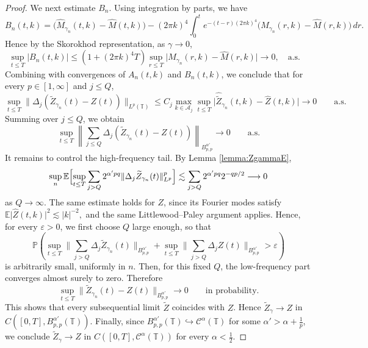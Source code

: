 \documentclass[10pt,a4paper]{amsart}
\begin{document}
\begin{proof}
We next estimate \(B_n\). Using integration by parts, we have
\[
B_n(t,k)
=
\bigl(\widehat M_{\gamma_n}(t,k)-\widehat M(t,k)\bigr)
-
(2\pi k)^4
\int_0^t
e^{-(t-r)(2\pi k)^4}
\bigl(\widehat M_{\gamma_n}(r,k)-\widehat M(r,k)\bigr)\,dr.
\]
Hence by the Skorokhod representation, as $\gamma \to 0$,
\[
\sup_{t\le T}|B_n(t,k)|
\le
\left(1+(2\pi k)^4T\right)
\sup_{r\le T}
\bigl|
\widehat M_{\gamma_n}(r,k)-\widehat M(r,k)
\bigr| \to 0, \quad \text{a.s.} \quad 
\]
Combining with convergences of $A_n(t,k)$ and $B_n(t,k)$, we conclude that for every \(p\in[1,\infty]\) and \(j \le Q\),
\[
\sup_{t\le T}
\|\Delta_j(\widetilde Z_{\gamma_n}(t)-Z(t))\|_{L^p(\mathbb T)}
\le
C_j
\max_{k\in\mathcal A_j}
\sup_{t\le T}
\bigl|
\widehat{\widetilde Z}_{\gamma_n}(t,k)-\widehat Z(t,k)
\bigr|
\longrightarrow0
\qquad\text{a.s.}
\]
Summing over \(j \le Q\), we obtain
\[
\sup_{t\le T}
\left\|
\sum_{j \le Q}\Delta_j(\widetilde Z_{\gamma_n}(t)-Z(t))
\right\|_{B^{\alpha'}_{p,p}}
\rightarrow0
\qquad\text{a.s.}
\]
It remains to control the high-frequency tail.
By Lemma \ref{lemma:ZgammaE},
\[
\sup_n
\mathbb E
\Bigl[
\sup_{t\le T}
\sum_{j>Q}2^{\alpha' pq}\|\Delta_j\widetilde Z_{\gamma_n}(t)\|_{L^p}^p
\Bigr]
\lesssim
\sum_{j>Q}2^{\alpha' pq}2^{-qp/2}\longrightarrow0
\]
as \(Q\to\infty\).
The same estimate holds for \(Z\), since its Fourier modes satisfy
\(
\mathbb E\bigl|\widehat Z(t,k)\bigr|^2
\lesssim |k|^{-2},
\)
and the same Littlewood--Paley argument applies.
Hence, for every \(\varepsilon>0\), we first choose \(Q\) large enough, so that
\[
\mathbb P\!\left(
\sup_{t\le T} \big\|\sum_{j>Q}\Delta_j\widetilde Z_{\gamma_n}(t)
\big\|_{B^{\alpha'}_{p,p}} + \sup_{t\le T}
\big\|\sum_{j>Q}\Delta_j Z(t) \big\|_{B^{\alpha'}_{p,p}} > \varepsilon
\right)
\]
is arbitrarily small, uniformly in \(n\). Then, for this fixed \(Q\), the low-frequency part converges almost surely to zero.
Therefore
\[
\sup_{t\le T}\|\widetilde Z_{\gamma_n}(t)-Z(t)\|_{B^{ \alpha'}_{p,p}}
\rightarrow0
\qquad\text{in probability.}
\]
This shows that every subsequential limit \(\widetilde Z\) coincides with \(Z\).
Hence
\(
\widetilde Z_\gamma\rightarrow Z\) in \(C([0,T],B^{\alpha'}_{p,p}(\mathbb T)).
\)
Finally, since
\(
B^{\alpha'}_{p,p}(\mathbb T)\hookrightarrow \mathcal C^\alpha(\mathbb T)
\)
for some $\alpha'>\alpha+\frac1p$,
we conclude
$\widetilde Z_\gamma \rightarrow Z$ in $C([0,T],\mathcal C^\alpha(\mathbb T))$
for every \(\alpha<\frac12\).
\end{proof}
\end{document}
